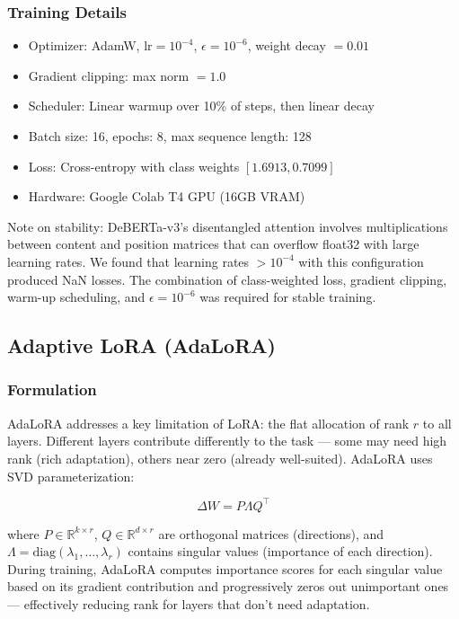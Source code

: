 \documentclass[12pt,a4paper]{article}
\theoremstyle{definition}
\begin{document}
\subsubsection{Training Details}

\begin{itemize}
    \item Optimizer: AdamW, $\text{lr} = 10^{-4}$, $\epsilon = 10^{-6}$, weight decay $= 0.01$
    \item Gradient clipping: max norm $= 1.0$
    \item Scheduler: Linear warmup over 10\% of steps, then linear decay
    \item Batch size: 16, epochs: 8, max sequence length: 128
    \item Loss: Cross-entropy with class weights $[1.6913, 0.7099]$
    \item Hardware: Google Colab T4 GPU (16GB VRAM)
\end{itemize}

Note on stability: DeBERTa-v3's disentangled attention involves multiplications between content and position matrices that can overflow float32 with large learning rates. We found that learning rates $> 10^{-4}$ with this configuration produced NaN losses. The combination of class-weighted loss, gradient clipping, warm-up scheduling, and $\epsilon = 10^{-6}$ was required for stable training.

\subsection{Adaptive LoRA (AdaLoRA)}

\subsubsection{Formulation}

AdaLoRA \cite{zhang2023adalora} addresses a key limitation of LoRA: the flat allocation of rank $r$ to all layers. Different layers contribute differently to the task — some may need high rank (rich adaptation), others near zero (already well-suited). AdaLoRA uses SVD parameterization:

\begin{equation}
\Delta W = P \Lambda Q^\top
\end{equation}

where $P \in \mathbb{R}^{k \times r}$, $Q \in \mathbb{R}^{d \times r}$ are orthogonal matrices (directions), and $\Lambda = \text{diag}(\lambda_1, \ldots, \lambda_r)$ contains singular values (importance of each direction). During training, AdaLoRA computes importance scores for each singular value based on its gradient contribution and progressively zeros out unimportant ones — effectively reducing rank for layers that don't need adaptation.
\end{document}
